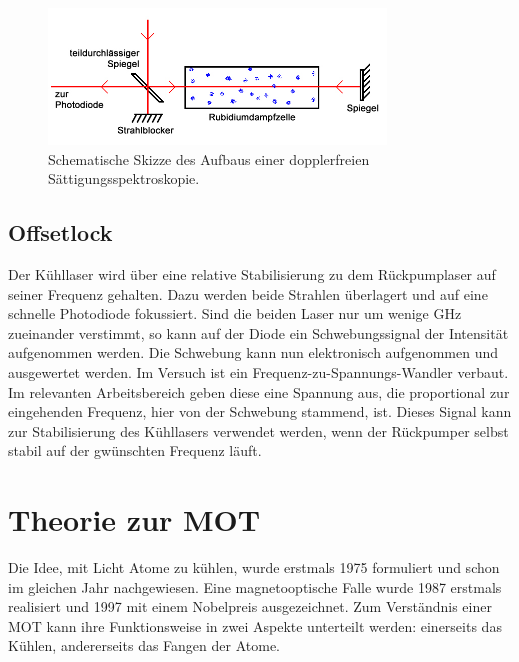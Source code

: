 \documentclass[
class=book,
accentcolor=1b,
custommargins=geometry,
fontsize=11pt,
thesis={type=Versuchsanleitung},
ruledheaders=all,
headline=false,
instbox=false,
marginpar=false,
title=small,
ignore-missing-data=true,
twoside=false,
logofile=apqdesign/tuda_logo.pdf,
pdfa=false %
]{apqpub}
\begin{document}
				\begin{figure}[htb!]
					\centering
					\includegraphics[width=0.8\textwidth]{graphics/DSS.jpg}
					\caption{Schematische Skizze des Aufbaus einer dopplerfreien Sättigungsspektroskopie.}
					\label{fig:DSS}
				\end{figure}
				
				\section{Offsetlock}\label{ssec:Offsetlock}			
				Der Kühllaser wird über eine relative Stabilisierung zu dem Rückpumplaser auf seiner Frequenz gehalten. Dazu werden beide Strahlen überlagert und auf eine schnelle Photodiode fokussiert. Sind die beiden Laser nur um wenige GHz zueinander verstimmt, so kann auf der Diode ein Schwebungssignal der Intensität aufgenommen werden. Die Schwebung kann nun elektronisch aufgenommen und ausgewertet werden.
				Im Versuch ist ein Frequenz-zu-Spannungs-Wandler verbaut. 
				Im relevanten Arbeitsbereich geben diese eine Spannung aus, die proportional zur eingehenden Frequenz, hier von der Schwebung stammend, ist. 
				Dieses Signal kann zur Stabilisierung des Kühllasers verwendet werden, wenn der Rückpumper selbst stabil auf der gwünschten Frequenz läuft.				
				
				\chapter{Theorie zur MOT}	
				Die Idee, mit Licht Atome zu kühlen, wurde erstmals 1975 formuliert und schon im gleichen Jahr nachgewiesen.\cite{pap:hansch}
				Eine magnetooptische Falle wurde 1987 erstmals realisiert und 1997 mit einem Nobelpreis ausgezeichnet.\cite{NL}
				Zum	Verständnis einer MOT kann ihre Funktionsweise in zwei Aspekte unterteilt werden: einerseits das Kühlen, andererseits das Fangen der Atome.
				
\end{document}
